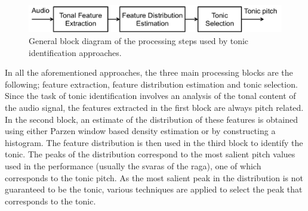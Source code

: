 \begin{figure}
	\begin{center}
		\includegraphics[width=\figSizeNinety]{ch02_background/figures/tonic_identification_block_diagram.pdf}
	\end{center}
	\caption[General block diagram of the processing steps used by tonic identification
	approaches.]{General block diagram of the processing steps used by tonic identification
		approaches.}
	\label{fig:tonic_identification_general_block_diagram}
\end{figure}

In all the aforementioned approaches, the three main processing blocks are the following; feature extraction, feature distribution estimation and tonic selection. Since the task of tonic identification involves an analysis of the tonal content of the audio signal, the features extracted in the first block are always pitch related. In the second block, an estimate of the distribution of these features is obtained using either Parzen window based density estimation or by constructing a histogram. The feature distribution is then used in the third block to identify the tonic. The peaks of the distribution correspond to the most salient pitch values used in the performance (usually the \glspl{svara} of the \gls{raga}), one of which corresponds to the tonic pitch. As the most salient peak in the distribution is not guaranteed to be the tonic, various techniques are applied to select the peak that corresponds to the tonic.



